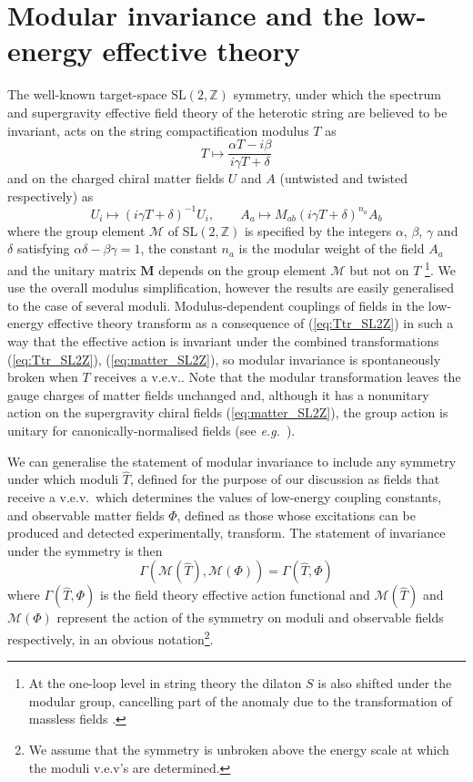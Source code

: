 \documentclass[a4paper,12pt]{article}
\begin{document}
\section{Modular invariance and the low-energy effective theory} 

The well-known target-space SL$(2,\mathbb{Z})$ symmetry, under which the spectrum and supergravity effective field theory of the heterotic string are believed to be invariant, acts on the string compactification modulus $T$ as
\begin{equation}
T \mapsto \frac{\alpha T-i\beta}{i\gamma T+\delta} \label{eq:Ttr_SL2Z}
\end{equation}
and on the charged chiral matter fields $U$ and $A$ (untwisted and twisted respectively) as
\begin{equation} 
U_i \mapsto (i\gamma T+\delta)^{-1}U_i, \qquad A_a \mapsto M_{ab} (i\gamma T+\delta)^{n_a} A_b \label{eq:matter_SL2Z}
\end{equation}
where the group element $\mathcal{M}$ of SL$(2,\mathbb{Z})$ is specified by the integers $\alpha$, $\beta$, $\gamma$ and $\delta$ satisfying $\alpha\delta-\beta\gamma=1$, the constant $n_a$ is the modular weight of the field $A_a$ and the unitary matrix $\mathbf{M}$ depends on the group element $\mathcal{M}$ but not on $T$ \cite{FerraraLT,LauerMN91}\footnote{At the one-loop level in string theory the dilaton $S$ is also shifted under the modular group, cancelling part of the anomaly due to the transformation of massless fields \cite{DerendingerFKZ,Ibanez:1992hc}.}. We use the overall modulus simplification, however the results are easily generalised to the case of several moduli. Modulus-dependent couplings of fields in the low-energy effective theory transform as a consequence of (\ref{eq:Ttr_SL2Z}) in such a way that the effective action is invariant under the combined transformations (\ref{eq:Ttr_SL2Z}), (\ref{eq:matter_SL2Z}), so modular invariance is spontaneously broken when $T$ receives a v.e.v.. Note that the modular transformation leaves the gauge charges of matter fields unchanged and, although it has a nonunitary action on the supergravity chiral fields (\ref{eq:matter_SL2Z}), the group action is unitary for canonically-normalised fields (see {\em e.g.\/}\ \cite{deCarlos:1993pd}).

We can generalise the statement of modular invariance to include any symmetry under which moduli $\hat{T}$, defined for the purpose of our discussion as fields that receive a v.e.v.\ which determines the values of low-energy coupling constants, and observable matter fields $\Phi$, defined as those whose excitations can be produced and detected experimentally, transform. The statement of invariance under the symmetry is then
\begin{equation}
\Gamma(\mathcal{M}(\hat{T}),\mathcal{M}(\Phi)) = \Gamma(\hat{T},\Phi) 
\label{eq:modinv}
\end{equation}
where $\Gamma(\hat{T},\Phi)$ is the field theory effective action functional and $\mathcal{M}(\hat{T})$ and $\mathcal{M}(\Phi)$ represent the action of the symmetry on moduli and observable fields respectively, in an obvious notation\footnote{We assume that the symmetry is unbroken above the energy scale at which the moduli v.e.v's are determined.}.
\end{document}
